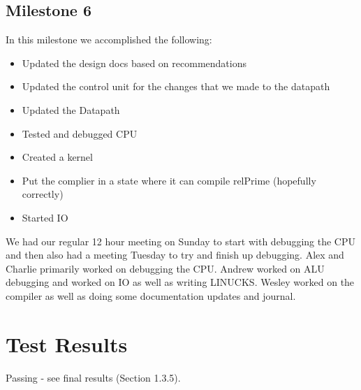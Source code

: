 \documentclass{report}
\begin{document}
	\section{Milestone 6}
		In this milestone we accomplished the following:
		\begin{itemize}
			\item Updated the design docs based on recommendations
			\item Updated the control unit for the changes that we made to the datapath
			\item Updated the Datapath
			\item Tested and debugged CPU
			\item Created a kernel
			\item Put the complier in a state where it can compile relPrime (hopefully correctly)
			\item Started IO
		\end{itemize}
		We had our regular 12 hour meeting on Sunday to start with debugging the CPU and then also had a meeting Tuesday to try and finish up debugging.  Alex and Charlie primarily worked on debugging the CPU.  Andrew worked on ALU debugging and worked on IO as well as writing LINUCKS.  Wesley worked on the compiler as well as doing some documentation updates and journal.
\chapter{Test Results}
	Passing - see final results (Section 1.3.5).
\end{document}

